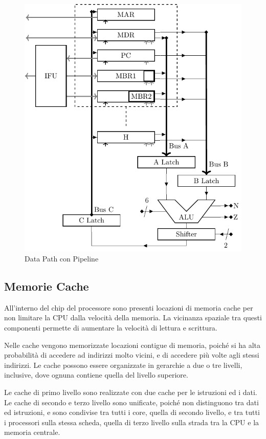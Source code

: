 \documentclass{article}
\numberwithin{equation}{subsection}
\begin{document}
\begin{figure}[H]%
    \centering%
    \includegraphics[scale=0.9]{data-path-pipeline.pdf}%
    \caption{Data Path con Pipeline}%
\end{figure}

\subsection{Memorie Cache}

All'interno del chip del processore sono presenti locazioni di memoria cache per non limitare la CPU dalla velocità della memoria. La vicinanza spaziale 
tra questi componenti permette di aumentare la velocità di lettura e scrittura. 

Nelle cache vengono memorizzate locazioni contigue di memoria, poiché si ha alta probabilità di accedere ad indirizzi molto vicini, e di accedere più volte 
agli stessi indirizzi. 
Le cache possono essere organizzate in gerarchie a due o tre livelli, inclusive, dove ognuna contiene quella del livello superiore. 


Le cache di primo livello sono realizzate con due cache per le istruzioni ed i dati. Le cache di secondo e terzo livello sono unificate, poiché non distinguono tra dati ed 
istruzioni, e sono condivise tra tutti i core, quella di secondo livello, e tra tutti i processori sulla stessa scheda, quella di terzo livello sulla strada tra la CPU e la 
memoria centrale. 
\end{document}
